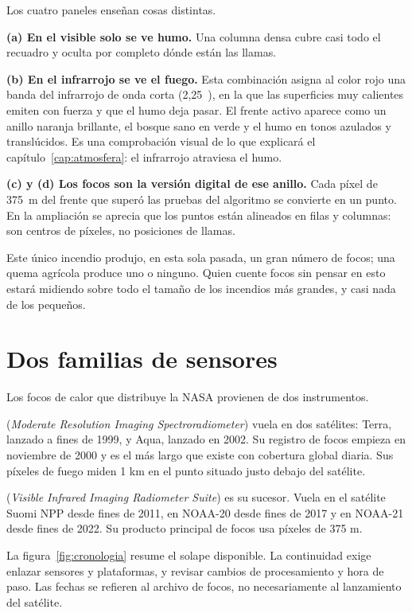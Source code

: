 Los cuatro paneles enseñan cosas distintas.

\textbf{(a) En el visible solo se ve humo.} Una columna densa cubre casi todo el recuadro y
oculta por completo dónde están las llamas.

\textbf{(b) En el infrarrojo se ve el fuego.} Esta combinación asigna al color rojo una banda
del infrarrojo de onda corta (2,25~\um), en la que las superficies muy calientes emiten con
fuerza y que el humo deja pasar. El frente activo aparece como un anillo naranja brillante, el
bosque sano en verde y el humo en tonos azulados y translúcidos. Es una comprobación visual de
lo que explicará el capítulo~\ref{cap:atmosfera}: el infrarrojo atraviesa el humo.

\textbf{(c) y (d) Los focos son la versión digital de ese anillo.} Cada píxel de 375~m del
frente que superó las pruebas del algoritmo se convierte en un punto. En la ampliación se
aprecia que los puntos están alineados en filas y columnas: son centros de píxeles, no
posiciones de llamas.

Este único incendio produjo, en esta sola pasada, un gran número de focos; una quema agrícola
produce uno o ninguno. Quien cuente focos sin pensar en esto estará midiendo sobre todo el
tamaño de los incendios más grandes, y casi nada de los pequeños.

\section{Dos familias de sensores}

Los focos de calor que distribuye la NASA provienen de dos instrumentos.

 (\emph{Moderate Resolution Imaging Spectroradiometer}) vuela en dos satélites:
Terra, lanzado a fines de 1999, y Aqua, lanzado en 2002. Su registro de focos empieza en
noviembre de 2000 y es el más largo que existe con cobertura global diaria. Sus píxeles de
fuego miden 1 km en el punto situado justo debajo del satélite.

 (\emph{Visible Infrared Imaging Radiometer Suite}) es su sucesor. Vuela en el
satélite Suomi NPP desde fines de 2011, en NOAA-20 desde fines de 2017 y en NOAA-21 desde fines
de 2022. Su producto principal de focos usa píxeles de 375 m.

La figura~\ref{fig:cronologia} resume el solape disponible. La continuidad exige enlazar
sensores y plataformas, y revisar cambios de procesamiento y hora de paso. Las fechas
se refieren al archivo de focos, no necesariamente al lanzamiento del satélite.

